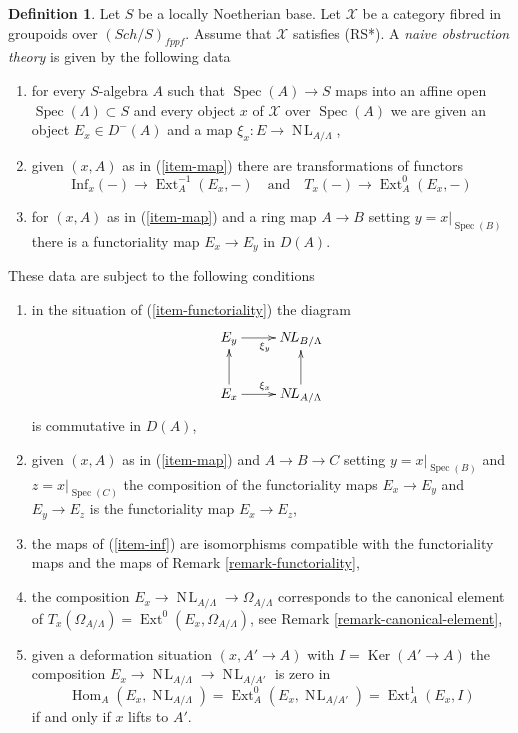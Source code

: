 \documentclass{stacks-project}
\theoremstyle{plain}
\theoremstyle{definition}
\newtheorem{definition}[subsection]{Definition}
\theoremstyle{remark}
\numberwithin{equation}{subsection}
\def\Spec{\mathop{\mathrm{Spec}}}
\def\Hom{\mathop{\mathrm{Hom}}\nolimits}
\def\Ext{\mathop{\mathrm{Ext}}\nolimits}
\def\Sch{\mathit{Sch}}
\def\NL{\mathop{N\!L}\nolimits}
\def\Ker{\mathop{\mathrm{Ker}}}
\begin{document}
\begin{definition}
\label{definition-naive-obstruction-theory}
Let $S$ be a locally Noetherian base. Let $\mathcal{X}$ be a category fibred
in groupoids over $(\Sch/S)_{fppf}$. Assume that $\mathcal{X}$
satisfies (RS*). A {\it naive obstruction theory} is 
given by the following data
\begin{enumerate}
\item
\label{item-map}
for every $S$-algebra $A$ such that $\Spec(A) \to S$
maps into an affine open $\Spec(\Lambda) \subset S$ and every object $x$
of $\mathcal{X}$ over $\Spec(A)$ we are given an object $E_x \in D^-(A)$
and a map $\xi_x : E \to \NL_{A/\Lambda}$,
\item
\label{item-inf}
given $(x, A)$ as in (\ref{item-map}) there are transformations of
functors
$$
\text{Inf}_x( - ) \to \Ext^{-1}_A(E_x, -)
\quad\text{and}\quad
T_x(-) \to \Ext^0_A(E_x, -)
$$
\item
\label{item-functoriality}
for $(x, A)$ as in (\ref{item-map}) and a ring map $A \to B$
setting $y = x|_{\Spec(B)}$ there is a functoriality map
$E_x \to E_y$ in $D(A)$.
\end{enumerate}
These data are subject to the following conditions
\begin{enumerate}
\item[(i)]
in the situation of (\ref{item-functoriality}) the diagram
$$
\xymatrix{
E_y \ar[r]_{\xi_y} & \NL_{B/\Lambda} \\
E_x \ar[u] \ar[r]^{\xi_x} & \NL_{A/\Lambda} \ar[u]
}
$$
is commutative in $D(A)$,
\item[(ii)]
given $(x, A)$ as in (\ref{item-map}) and $A \to B \to C$
setting $y = x|_{\Spec(B)}$ and $z = x|_{\Spec(C)}$ the
composition of the functoriality maps $E_x \to E_y$ and $E_y \to E_z$ is
the functoriality map $E_x \to E_z$,
\item[(iii)]
the maps of (\ref{item-inf}) are isomorphisms
compatible with the functoriality
maps and the maps of Remark \ref{remark-functoriality},
\item[(iv)]
the composition $E_x \to \NL_{A/\Lambda} \to \Omega_{A/\Lambda}$
corresponds to the canonical element of
$T_x(\Omega_{A/\Lambda}) = \Ext^0(E_x, \Omega_{A/\Lambda})$, see
Remark \ref{remark-canonical-element},
\item[(v)]
given a deformation situation $(x, A' \to A)$ with $I = \Ker(A' \to A)$
the composition $E_x \to \NL_{A/\Lambda} \to \NL_{A/A'}$ is zero in
$$
\Hom_A(E_x, \NL_{A/\Lambda}) = \Ext^0_A(E_x, \NL_{A/A'}) =
\Ext^1_A(E_x, I)
$$
if and only if $x$ lifts to $A'$.
\end{enumerate}
\end{definition}
\end{document}
